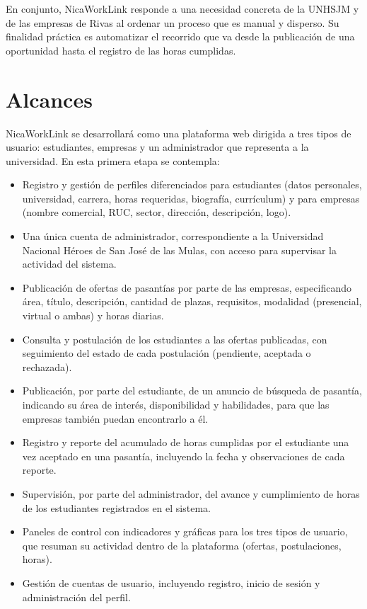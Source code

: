 En conjunto, NicaWorkLink responde a una necesidad concreta de la UNHSJM y de las empresas de Rivas al ordenar un proceso que es manual y disperso. Su finalidad práctica es automatizar el recorrido que va desde la publicación de una oportunidad hasta el registro de las horas cumplidas.

\section{Alcances}

NicaWorkLink se desarrollará como una plataforma web dirigida a tres tipos de usuario: estudiantes, empresas y un administrador que representa a la universidad. En esta primera etapa se contempla:

\begin{itemize}
	\item Registro y gestión de perfiles diferenciados para estudiantes (datos personales, universidad, carrera, horas requeridas, biografía, currículum) y para empresas (nombre comercial, RUC, sector, dirección, descripción, logo).
	\item Una única cuenta de administrador, correspondiente a la Universidad Nacional Héroes de San José de las Mulas, con acceso para supervisar la actividad del sistema.
	\item Publicación de ofertas de pasantías por parte de las empresas, especificando área, título, descripción, cantidad de plazas, requisitos, modalidad (presencial, virtual o ambas) y horas diarias.
	\item Consulta y postulación de los estudiantes a las ofertas publicadas, con seguimiento del estado de cada postulación (pendiente, aceptada o rechazada).
	\item Publicación, por parte del estudiante, de un anuncio de búsqueda de pasantía, indicando su área de interés, disponibilidad y habilidades, para que las empresas también puedan encontrarlo a él.
	\item Registro y reporte del acumulado de horas cumplidas por el estudiante una vez aceptado en una pasantía, incluyendo la fecha y observaciones de cada reporte.
	\item Supervisión, por parte del administrador, del avance y cumplimiento de horas de los estudiantes registrados en el sistema.
	\item Paneles de control con indicadores y gráficas para los tres tipos de usuario, que resuman su actividad dentro de la plataforma (ofertas, postulaciones, horas).
	\item Gestión de cuentas de usuario, incluyendo registro, inicio de sesión y administración del perfil.
\end{itemize}

